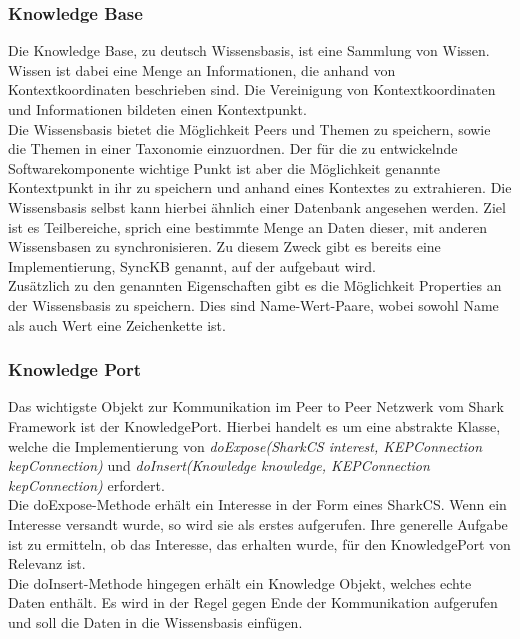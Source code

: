 \documentclass[a4paper]{article}
\begin{document}
	\subsubsection{Knowledge Base} 
	Die Knowledge Base, zu deutsch Wissensbasis, ist eine Sammlung von Wissen.
	Wissen ist dabei eine Menge an Informationen, die anhand von
	Kontextkoordinaten beschrieben sind. Die Vereinigung von Kontextkoordinaten
	und Informationen bildeten einen Kontextpunkt.\\
	
	Die Wissensbasis bietet die Möglichkeit Peers und Themen zu speichern, sowie
	die Themen in einer Taxonomie einzuordnen. Der für die zu entwickelnde
	Softwarekomponente wichtige Punkt ist aber die Möglichkeit genannte
	Kontextpunkt in ihr zu speichern und anhand eines Kontextes zu extrahieren.
	Die Wissensbasis selbst kann hierbei ähnlich einer Datenbank angesehen werden.
	Ziel ist es Teilbereiche, sprich eine bestimmte Menge an Daten dieser, mit
	anderen Wissensbasen zu synchronisieren. Zu diesem Zweck gibt es bereits eine
	Implementierung, SyncKB genannt, auf der aufgebaut wird. \\
	
	Zusätzlich zu den genannten Eigenschaften gibt es die Möglichkeit Properties
	an der Wissensbasis zu speichern. Dies sind Name-Wert-Paare, wobei sowohl Name 
	als auch Wert eine Zeichenkette ist.
	
	\subsubsection{Knowledge Port} 
	Das wichtigste Objekt zur Kommunikation im Peer to Peer Netzwerk vom Shark
	Framework ist der KnowledgePort. Hierbei handelt es um eine abstrakte Klasse,
	welche die Implementierung von \emph{doExpose(SharkCS interest, KEPConnection
	kepConnection)} und \emph{doInsert(Knowledge knowledge, KEPConnection
	kepConnection)} erfordert. \\
	
	Die doExpose-Methode erhält ein Interesse in der Form eines SharkCS. Wenn
	ein Interesse versandt wurde, so wird sie als erstes aufgerufen. Ihre 
	generelle Aufgabe ist zu ermitteln, ob das Interesse, das erhalten wurde, 
	für den KnowledgePort von Relevanz ist. \\
	
	Die doInsert-Methode hingegen erhält ein Knowledge Objekt, welches echte
	Daten enthält. Es wird in der Regel gegen Ende der Kommunikation aufgerufen
	und soll die Daten in die Wissensbasis einfügen. \\
	
\end{document}
